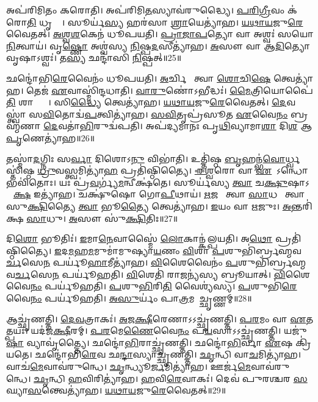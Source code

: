 𑌅𑌪॑𑌰𑌿𑌮𑌿𑌤𑌂 𑌕𑌰𑍋𑌤𑌿। 
𑌅𑌪॑𑌰𑌿𑌮𑌿\ul{𑌤}𑌸𑍍𑌯𑌾𑌵॑𑌰𑍁𑌦𑍍𑌧𑍍𑌯𑍈। 
\ul{𑌪}\ul{𑌰𑌿}\ul{𑌗𑍍𑌰𑍀}𑌵𑌂 𑌕॑𑌰𑍋\ul{𑌤𑌿} 𑌧𑍃𑌤𑍍𑌯𑍈᳚। 
𑌸𑍂𑌰𑍍𑌯॑\ul{𑌸𑍍𑌯} 𑌹𑌰॑𑌸𑌾 \ul{𑌶𑍍𑌰𑌾}𑌯𑍇𑌤𑍍𑌯𑌾॑𑌹। 
\ul{𑌯}\ul{𑌥𑌾}\ul{𑌯}𑌜𑍁\ul{𑌰𑍇}𑌵𑍈𑌤𑌤𑍍। 
\ul{𑌅}\ul{𑌶𑍍𑌵}\ul{𑌶}𑌕𑍇𑌨॑ 𑌧𑍂𑌪𑌯𑌤𑌿। 
\ul{𑌪𑍍𑌰𑌾}\ul{𑌜𑌾}\ul{𑌪}𑌤𑍍𑌯𑍋 𑌵𑌾 𑌅𑌶𑍍𑌵𑌃॑ 𑌸𑌯𑍋\ul{𑌨𑌿}𑌤𑍍𑌵𑌾𑌯॑। 
𑌵𑍃\ul{𑌷𑍍𑌣𑍋} 𑌅𑌶𑍍𑌵॑𑌸𑍍𑌯 \ul{𑌨𑌿}𑌷𑍍𑌪\ul{𑌦}𑌸𑍀𑌤𑍍𑌯𑌾॑𑌹। 
\ul{𑌅}𑌸𑍗 𑌵𑌾 𑌆॑\ul{𑌦𑌿}𑌤𑍍𑌯𑍋 𑌵𑍃𑌷𑌾𑌽𑌶𑍍𑌵𑌃॑। 
𑌤\ul{𑌸𑍍𑌯} 𑌛𑌨𑍍𑌦𑌾॑𑌸𑌿 \ul{𑌨𑌿}𑌷𑍍𑌪𑌤𑍍॥25॥

𑌛𑌨𑍍𑌦𑍋॑𑌭𑌿\ul{𑌰𑍇}𑌵𑍈𑌨𑌂॑ 𑌧𑍂𑌪𑌯𑌤𑌿। 
\ul{𑌅}𑌰𑍍𑌚𑌿𑌷𑍇᳚ 𑌤𑍍𑌵𑌾 \ul{𑌶𑍋}𑌚𑌿\ul{𑌷𑍇} 𑌤𑍍𑌵𑍇𑌤𑍍𑌯𑌾॑𑌹। 
𑌤𑍇𑌜॑ \ul{𑌏}𑌵𑌾𑌸𑍍𑌮𑌿॑𑌨𑍍𑌦𑌧𑌾𑌤𑌿। 
\ul{𑌵𑌾}\ul{𑌰𑍁}𑌣𑍋॑𑌽𑌭𑍀𑌦𑍍𑌧𑌃॑। 
\ul{𑌮𑍈}𑌤𑍍𑌰𑌿𑌯𑍋𑌪𑍈॑\ul{𑌤𑌿} 𑌶𑌾𑌨𑍍𑌤𑍍𑌯𑍈᳚। 
𑌸𑌿\ul{𑌦𑍍𑌧𑍍𑌯𑍈} 𑌤𑍍𑌵𑍇𑌤𑍍𑌯𑌾॑𑌹। 
\ul{𑌯}\ul{𑌥𑌾}\ul{𑌯}𑌜𑍁\ul{𑌰𑍇}𑌵𑍈𑌤𑌤𑍍। 
\ul{𑌦𑍇}𑌵𑌸𑍍𑌤𑍍𑌵𑌾॑ 𑌸\ul{𑌵𑌿}𑌤𑍋𑌦𑍍𑌵॑\ul{𑌪}𑌤𑍍𑌵𑌿𑌤𑍍𑌯𑌾॑𑌹। 
\ul{𑌸}\ul{𑌵𑌿}𑌤𑍃𑌪𑍍𑌰॑𑌸𑍂𑌤 \ul{𑌏}𑌵𑍈\ul{𑌨𑌂} 𑌬𑍍𑌰𑌹𑍍𑌮॑𑌣𑌾 \ul{𑌦𑍇}𑌵𑌤𑌾॑\ul{𑌭𑌿}𑌰𑍁𑌦𑍍𑌵॑𑌪𑌤𑌿। 
𑌅𑌪॑𑌦𑍍𑌯𑌮𑌾𑌨𑌃 𑌪𑍃\ul{𑌥𑌿}𑌵𑍍𑌯𑌾𑌮𑌾\ul{𑌶𑌾} 𑌦𑌿\ul{𑌶} 𑌆\ul{𑌪𑍃}𑌣𑍇𑌤𑍍𑌯𑌾॑𑌹॥26॥

𑌤𑌸𑍍𑌮𑌾॑\ul{𑌦}𑌗𑍍𑌨𑌿𑌃 𑌸\ul{𑌰𑍍𑌵𑌾} 𑌦𑌿𑌶𑍋𑌽\ul{𑌨𑍁} 𑌵𑌿𑌭𑌾॑𑌤𑌿। 
𑌉𑌤𑍍𑌤𑌿॑𑌷𑍍𑌠 \ul{𑌬𑍃}𑌹𑌨𑍍𑌭॑\ul{𑌵𑍋}𑌰𑍍𑌧𑍍𑌵𑌸𑍍𑌤𑌿॑𑌷𑍍𑌠 \ul{𑌧𑍍𑌰𑍁}𑌵𑌸𑍍𑌤𑍍𑌵𑌮𑌿𑌤𑍍𑌯𑌾॑\ul{𑌹} 𑌪𑍍𑌰𑌤𑌿॑𑌷𑍍𑌠𑌿𑌤𑍍𑌯𑍈। 
\ul{𑌈}\ul{𑌶𑍍𑌵}𑌰𑍋 𑌵𑌾 \ul{𑌏}𑌷𑍋᳚𑌽𑌨𑍍𑌧𑍋 𑌭𑌵𑌿॑𑌤𑍋𑌃। 
𑌯𑌃 𑌪𑍍𑌰॑\ul{𑌵}𑌰𑍍𑌗𑍍𑌯॑\ul{𑌮}𑌨𑍍𑌵𑍀𑌕𑍍𑌷॑𑌤𑍇। 
𑌸𑍂𑌰𑍍𑌯॑𑌸𑍍𑌯 \ul{𑌤𑍍𑌵𑌾} 𑌚\ul{𑌕𑍍𑌷𑍁}𑌷𑌾𑌽𑌨𑍍𑌵𑍀᳚\ul{𑌕𑍍𑌷} 𑌇𑌤𑍍𑌯𑌾॑𑌹। 
𑌚𑌕𑍍𑌷𑍁॑𑌷𑍋 𑌗𑍋\ul{𑌪𑍀}𑌥𑌾𑌯॑। 
\ul{𑌋}𑌜𑌵𑍇᳚ 𑌤𑍍𑌵𑌾 \ul{𑌸𑌾}𑌧𑌵𑍇᳚ 𑌤𑍍𑌵𑌾 𑌸𑍁\ul{𑌕𑍍𑌷𑌿}𑌤𑍍𑌯𑍈 \ul{𑌤𑍍𑌵𑌾} 𑌭𑍂\ul{𑌤𑍍𑌯𑍈} 𑌤𑍍𑌵𑍇𑌤𑍍𑌯𑌾॑𑌹। 
\ul{𑌇}𑌯𑌂 𑌵𑌾 \ul{𑌋}𑌜𑍁𑌃। 
\ul{𑌅}𑌨𑍍𑌤𑌰𑌿॑𑌕𑍍𑌷 \ul{𑌸𑌾}𑌧𑍁। 
\ul{𑌅}𑌸𑍗 𑌸𑍁॑\ul{𑌕𑍍𑌷𑌿}𑌤𑌿𑌃॥27॥

𑌦𑌿\ul{𑌶𑍋} 𑌭𑍂𑌤𑌿𑌃॑। 
\ul{𑌇}𑌮𑌾\ul{𑌨𑍇}𑌵𑌾𑌸𑍍𑌮𑍈॑ \ul{𑌲𑍋}𑌕𑌾𑌨𑍍𑌕॑𑌲𑍍𑌪𑌯𑌤𑌿। 
𑌅\ul{𑌥𑍋} 𑌪𑍍𑌰𑌤𑌿॑𑌷𑍍𑌠𑌿𑌤𑍍𑌯𑍈। 
\ul{𑌇}𑌦\ul{𑌮}𑌹\ul{𑌮}𑌮𑍁𑌮𑌾॑𑌮𑍁𑌷𑍍𑌯𑌾\ul{𑌯}𑌣𑌂  \ul{𑌵𑌿}𑌶𑌾 \ul{𑌪}𑌶𑍁𑌭𑌿॑𑌰𑍍𑌬𑍍𑌰𑌹𑍍𑌮𑌵\ul{𑌰𑍍𑌚}𑌸𑍇\ul{𑌨} 𑌪𑌰𑍍𑌯𑍂॑\ul{𑌹𑌾}𑌮𑍀𑌤𑍍𑌯𑌾॑𑌹। 
\ul{𑌵𑌿}𑌶𑍈𑌵𑍈𑌨𑌂॑ \ul{𑌪}𑌶𑍁𑌭𑌿॑𑌰𑍍𑌬𑍍𑌰𑌹𑍍𑌮𑌵\ul{𑌰𑍍𑌚}𑌸𑍇\ul{𑌨} 𑌪𑌰𑍍𑌯𑍂॑𑌹𑌤𑌿। 
\ul{𑌵𑌿}𑌶𑍇𑌤𑌿॑ 𑌰𑌾\ul{𑌜}𑌨𑍍𑌯॑𑌸𑍍𑌯 𑌬𑍍𑌰𑍂𑌯𑌾𑌤𑍍। 
\ul{𑌵𑌿}𑌶𑍈𑌵𑍈\ul{𑌨𑌂} 𑌪𑌰𑍍𑌯𑍂॑𑌹𑌤𑌿। 
\ul{𑌪}𑌶𑍁\ul{𑌭𑌿}𑌰𑌿\ul{𑌤𑌿} 𑌵𑍈𑌶𑍍𑌯॑𑌸𑍍𑌯। 
\ul{𑌪}𑌶𑍁𑌭𑌿॑\ul{𑌰𑍇}𑌵𑍈\ul{𑌨𑌂} 𑌪𑌰𑍍𑌯𑍂॑𑌹𑌤𑌿। 
\ul{𑌅}\ul{𑌸𑍁}𑌰𑍍𑌯𑌂॑ 𑌪𑌾\ul{𑌤𑍍𑌰}𑌮𑌨𑌾᳚𑌚𑍍𑌛𑍃𑌣𑍍𑌣𑌮𑍍॥28॥

𑌆𑌚𑍍𑌛𑍃॑𑌣𑌤𑍍𑌤𑌿। 
\ul{𑌦𑍇}\ul{𑌵}𑌤𑍍𑌰𑌾𑌕𑌃॑। 
\ul{𑌅}\ul{𑌜}\ul{𑌕𑍍𑌷𑍀}𑌰𑍇𑌣𑌾𑌽𑌽𑌚𑍍𑌛𑍃॑𑌣𑌤𑍍𑌤𑌿। 
\ul{𑌪}\ul{𑌰}𑌮𑌂 𑌵𑌾 \ul{𑌏}𑌤𑌤𑍍𑌪𑌯𑌃॑। 
𑌯𑌦॑𑌜\ul{𑌕𑍍𑌷𑍀}𑌰𑌮𑍍। 
\ul{𑌪}\ul{𑌰}𑌮𑍇\ul{𑌣𑍈}𑌵𑍈\ul{𑌨𑌂} 𑌪\ul{𑌯}𑌸𑌾𑌽𑌽𑌚𑍍𑌛𑍃॑𑌣𑌤𑍍𑌤𑌿। 
𑌯𑌜𑍁॑\ul{𑌷𑌾} 𑌵𑍍𑌯𑌾𑌵𑍃॑𑌤𑍍𑌤𑍍𑌯𑍈। 
𑌛𑌨𑍍𑌦𑍋॑\ul{𑌭𑌿}𑌰𑌾𑌚𑍍𑌛𑍃॑𑌣𑌤𑍍𑌤𑌿। 
𑌛𑌨𑍍𑌦𑍋॑\ul{𑌭𑌿}𑌰𑍍𑌵𑌾 \ul{𑌏}𑌷 𑌕𑍍𑌰𑌿॑𑌯𑌤𑍇। 
𑌛𑌨𑍍𑌦𑍋॑𑌭𑌿\ul{𑌰𑍇}𑌵 𑌛\ul{𑌨𑍍𑌦𑌾}\ul{}𑌸𑍍𑌯𑌾𑌚𑍍𑌛𑍃॑𑌣𑌤𑍍𑌤𑌿। 
\ul{𑌛𑍃}𑌨𑍍𑌧𑌿 𑌵𑌾\ul{𑌚}𑌮𑌿𑌤𑍍𑌯𑌾॑𑌹। 
𑌵𑌾𑌚॑\ul{𑌮𑍇}𑌵𑌾𑌵॑𑌰𑍁𑌨𑍍𑌧𑍇। 
\ul{𑌛𑍃}𑌨𑍍𑌧𑍍𑌯𑍂\ul{𑌰𑍍𑌜}𑌮𑌿𑌤𑍍𑌯𑌾॑𑌹। 
𑌊𑌰𑍍𑌜॑\ul{𑌮𑍇}𑌵𑌾𑌵॑𑌰𑍁𑌨𑍍𑌧𑍇। 
\ul{𑌛𑍃}𑌨𑍍𑌧𑌿 \ul{𑌹}𑌵𑌿𑌰𑌿𑌤𑍍𑌯𑌾॑𑌹। 
\ul{𑌹}𑌵𑌿\ul{𑌰𑍇}𑌵𑌾𑌕𑌃॑। 
𑌦𑍇𑌵॑ 𑌪𑍁𑌰𑌶𑍍𑌚𑌰 \ul{𑌸}𑌘𑍍𑌯𑌾\ul{𑌸}𑌨𑍍𑌤𑍍𑌵𑍇𑌤𑍍𑌯𑌾॑𑌹। 
\ul{𑌯}\ul{𑌥𑌾}\ul{𑌯}𑌜𑍁\ul{𑌰𑍇}𑌵𑍈𑌤𑌤𑍍॥29॥

